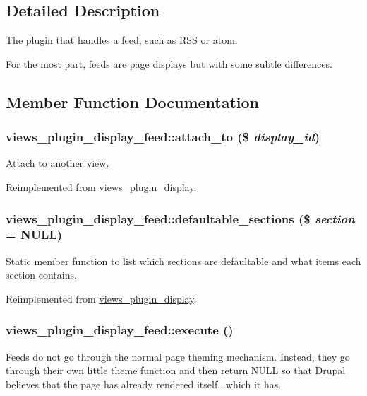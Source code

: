 \subsection{Detailed Description}
The plugin that handles a feed, such as RSS or atom.

For the most part, feeds are page displays but with some subtle differences. 

\subsection{Member Function Documentation}
\hypertarget{classviews__plugin__display__feed_aea8b688de38f11854afdb4194e87f59d}{
\subsubsection[{attach\_\-to}]{\setlength{\rightskip}{0pt plus 5cm}views\_\-plugin\_\-display\_\-feed::attach\_\-to (\$ {\em display\_\-id})}}
\label{classviews__plugin__display__feed_aea8b688de38f11854afdb4194e87f59d}
Attach to another \hyperlink{classview}{view}. 

Reimplemented from \hyperlink{classviews__plugin__display_aa74683048bca4e740cb7e25ae4c527d4}{views\_\-plugin\_\-display}.\hypertarget{classviews__plugin__display__feed_aadbff7e4fb0bc05dfee8bc38ea1349dc}{
\subsubsection[{defaultable\_\-sections}]{\setlength{\rightskip}{0pt plus 5cm}views\_\-plugin\_\-display\_\-feed::defaultable\_\-sections (\$ {\em section} = {\ttfamily NULL})}}
\label{classviews__plugin__display__feed_aadbff7e4fb0bc05dfee8bc38ea1349dc}
Static member function to list which sections are defaultable and what items each section contains. 

Reimplemented from \hyperlink{classviews__plugin__display_a1ff9cd1b5762dde8765e608efdec8ec4}{views\_\-plugin\_\-display}.\hypertarget{classviews__plugin__display__feed_a6bfa566313f3f8fba85751554567e2dd}{
\subsubsection[{execute}]{\setlength{\rightskip}{0pt plus 5cm}views\_\-plugin\_\-display\_\-feed::execute ()}}
\label{classviews__plugin__display__feed_a6bfa566313f3f8fba85751554567e2dd}
Feeds do not go through the normal page theming mechanism. Instead, they go through their own little theme function and then return NULL so that Drupal believes that the page has already rendered itself...which it has. 

